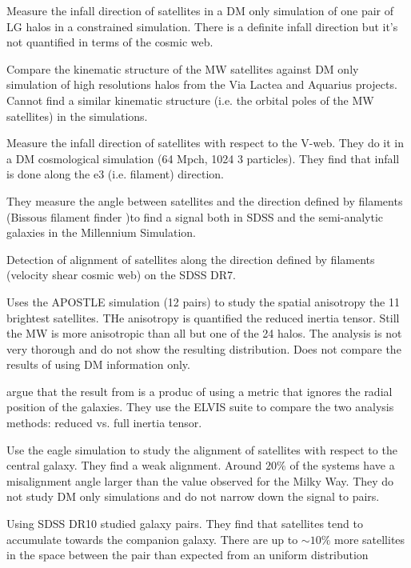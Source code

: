 \documentclass{emulateapj}
\begin{document}
\citep{2011MNRAS.411.1525L} Measure the infall direction of satellites
in a DM only simulation of one pair of LG halos in a constrained
simulation. There is a definite infall direction but it's not
quantified in terms of the cosmic web.
 
\citep{2012MNRAS.424...80P} Compare the kinematic structure of the MW
satellites against DM only simulation of high resolutions halos from
the Via Lactea and Aquarius projects.  Cannot find a similar kinematic
structure (i.e. the orbital poles of the MW satellites) in the
simulations. 

\citep{2014MNRAS.443.1274L} Measure the infall direction of satellites
with respect to the V-web. They do it in a DM cosmological simulation
(64 Mpch, 1024 3 particles). They find that infall is done along the
e3 (i.e. filament) direction.

\citep{2015MNRAS.450.2727T} They measure the angle between satellites
and the direction defined by filaments (Bissous filament finder )to
find a signal both in SDSS and the semi-analytic galaxies in the
Millennium Simulation.  

\citep{2015ApJ...799..212L} Detection of alignment of satellites along
the direction defined by filaments (velocity shear cosmic web) on the
SDSS DR7.



\citep{2016MNRAS.457.1931S} Uses the APOSTLE simulation (12 pairs) to study the
spatial anisotropy the 11 brightest satellites. THe anisotropy is
quantified the reduced inertia tensor. Still the MW is more
anisotropic than all but one of the 24 halos. The analysis is not very
thorough and do not show the resulting distribution. Does not compare
the results of using DM information only. 

\citep{2015ApJ...815...19P} argue that the result from
\citep{2016MNRAS.457.1931S} is a produc of using a metric that ignores
the radial position of the galaxies. They use the ELVIS suite to
compare the two analysis methods: reduced vs. full inertia tensor. 

\citep{2016arXiv160501728S} Use the eagle simulation to study the
alignment of satellites with respect to the central galaxy. They find
a weak alignment. Around $20\%$ of the systems have a misalignment
angle larger than the value observed for the Milky Way. They do not
study DM only simulations and do not narrow down the signal to pairs. 

\citep{2016arXiv160601516L} Using SDSS DR10 studied galaxy pairs. They find
that satellites tend to accumulate towards the companion galaxy. There
are up to $\sim 10\%$ more satellites in the space between the pair
than expected from an uniform distribution
\end{document}
